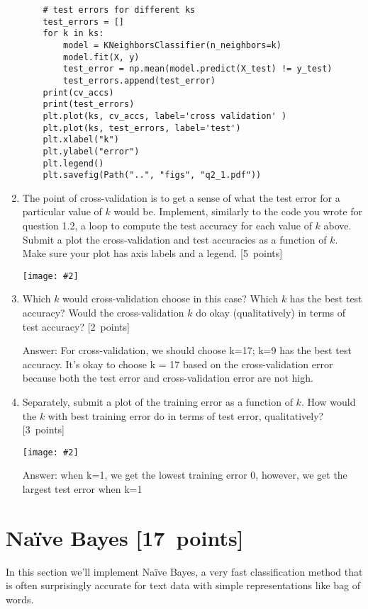 \documentclass{article}
\newcommand{\blu}[1]{{\textcolor{blu}{#1}}}
\newcommand{\gre}[1]{\textcolor{gre}{#1}}
\newcommand\ans[1]{\par\gre{Answer: #1}}
\let\ask\blu
\newcommand\pts[1]{\textcolor{pointscolour}{[#1~points]}}
\newcommand{\centerfig}[2]{\begin{center}\texttt{[image: \#2]}\end{center}}
\begin{document}
\begin{enumerate}
\begin{verbatim}
    # test errors for different ks
    test_errors = []
    for k in ks:
        model = KNeighborsClassifier(n_neighbors=k)
        model.fit(X, y)
        test_error = np.mean(model.predict(X_test) != y_test)
        test_errors.append(test_error)
    print(cv_accs)
    print(test_errors)
    plt.plot(ks, cv_accs, label='cross validation' )
    plt.plot(ks, test_errors, label='test')
    plt.xlabel("k")
    plt.ylabel("error")
    plt.legend()
    plt.savefig(Path("..", "figs", "q2_1.pdf"))
        \end{verbatim}
        
        \newpage
        \item The point of cross-validation is to get a sense of what the test error for a particular value of $k$ would be. Implement, similarly to the code you wrote for question 1.2, a loop to compute the test accuracy for each value of $k$ above. \ask{Submit a plot the cross-validation and test accuracies as a function of $k$.} Make sure your plot has axis labels and a legend. \pts{5}

        \centerfig{0.7}{./figs/q2_1.pdf}

        \item Which $k$ would cross-validation choose in this case? Which $k$ has the best test accuracy? Would the cross-validation $k$ do okay (qualitatively) in terms of test accuracy? \pts{2}

        \ans{For cross-validation, we should choose k=17; k=9 has the best test accuracy. It's okay to choose k = 17 based on the cross-validation error because both the test error and cross-validation error are not high.}

        \newpage
        \item Separately, \ask{submit a plot of the training error as a function of $k$. How would the $k$ with best training error do in terms of test error, qualitatively?} \pts{3}
        \centerfig{0.7}{./figs/q2_2.pdf}
        \ans{when k=1, we get the lowest training error 0, however, we get the largest test error when k=1 }
    \end{enumerate}



    \clearpage
    \section{Na\"ive Bayes \pts{17}}

    In this section we'll implement Na\"ive Bayes, a very fast classification method that is often surprisingly accurate for text data with simple representations like bag of words.
\end{document}
